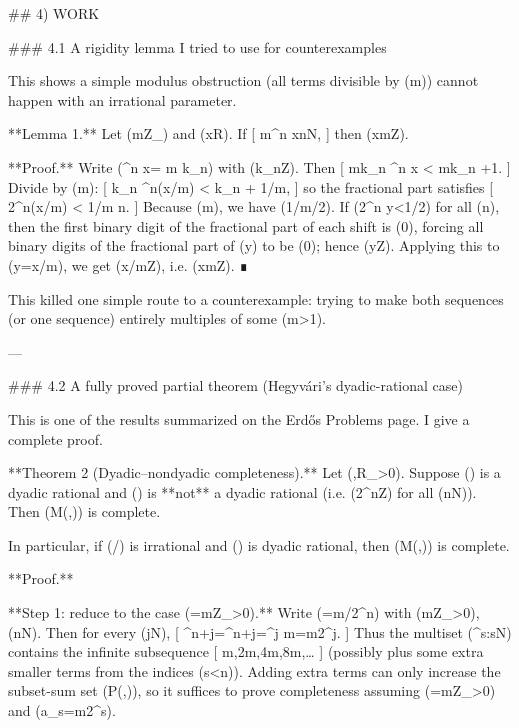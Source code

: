 ## 4) WORK

### 4.1 A rigidity lemma I tried to use for counterexamples

This shows a simple modulus obstruction (all terms divisible by (m)) cannot happen with an irrational parameter.

**Lemma 1.** Let (m\in\mathbb Z_{}) and (x\in\mathbb R). If
[
m\mid {}^n x\rfloor \quad{}n\in\mathbb N,
]
then (x\in m\mathbb Z).

**Proof.** Write (^n x\rfloor = m k_n) with (k_n\in\mathbb Z). Then
[
mk_n ^n x < mk_n +1.
]
Divide by (m):
[
k_n ^n(x/m) < k_n + 1/m,
]
so the fractional part satisfies
[
{2^n(x/m)} < 1/m \quad \forall n.
]
Because (m), we have (1/m/2). If ({2^n y}<1/2) for all (n), then the first binary digit of the fractional part of each shift is (0), forcing all binary digits of the fractional part of (y) to be (0); hence (y\in\mathbb Z). Applying this to (y=x/m), we get (x/m\in\mathbb Z), i.e. (x\in m\mathbb Z). ∎

This killed one simple route to a counterexample: trying to make both sequences (or one sequence) entirely multiples of some (m>1).

---

### 4.2 A fully proved partial theorem (Hegyvári’s dyadic-rational case)

This is one of the results summarized on the Erdős Problems page.  I give a complete proof.

**Theorem 2 (Dyadic–nondyadic completeness).**
Let (\alpha,\beta\in\mathbb R_{>0}). Suppose (\alpha) is a dyadic rational and (\beta) is **not** a dyadic rational (i.e. (2^n\beta\notin\mathbb Z) for all (n\in\mathbb N)). Then (M(\alpha,\beta)) is complete.

In particular, if (\alpha/\beta) is irrational and (\alpha) is dyadic rational, then (M(\alpha,\beta)) is complete.

**Proof.**

**Step 1: reduce to the case (\alpha=m\in\mathbb Z_{>0}).**
Write (\alpha=m/2^n) with (m\in\mathbb Z_{>0}), (n\in\mathbb N). Then for every (j\in\mathbb N),
[
\left{}^{n+j}\alpha\right\rfloor=\left{}^{n+j}\right\rfloor=^j m\rfloor=m2^j.
]
Thus the multiset ({^s\alpha\rfloor:s\in\mathbb N}) contains the infinite subsequence
[
m,2m,4m,8m,\dots
]
(possibly plus some extra smaller terms from the indices (s<n)). Adding extra terms can only increase the subset-sum set (P(\alpha,\beta)), so it suffices to prove completeness assuming (\alpha=m\in\mathbb Z_{>0}) and (a_s=m2^s).

